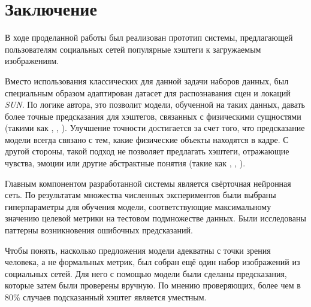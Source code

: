 \section*{Заключение}


\indent
\indent
\indent
В ходе проделанной работы был реализован прототип системы,
предлагающей пользователям социальных сетей популярные 
хэштеги к загружаемым изображениям.


\bigskip
\indent
\indent
Вместо использования классических для данной задачи наборов данных,
был специальным образом адаптирован 
датасет для распознавания сцен и локаций \textit{SUN}.
По логике автора, это позволит модели, обученной на таких данных,
давать более точные предсказания для хэштегов, связанных
с  физическими сущностями (такими как , , ).
Улучшение точности достигается за счет того, что предсказание модели всегда связано
с тем, какие физические объекты находятся в кадре. С другой стороны,
такой подход не позволяет предлагать хэштеги, отражающие чувства, эмоции
или другие абстрактные понятия (такие как , , ).


\bigskip
\indent
\indent
Главным компонентом разработанной системы является свёрточная 
нейронная сеть. По результатам множества численных экспериментов
были выбраны гиперпараметры для обучения модели, 
соответствующие максимальному 
значению целевой метрики на тестовом подмножестве данных.
Были исследованы паттерны возникновения ошибочных предсказаний.


\bigskip
\indent
\indent
Чтобы понять, насколько предложения модели адекватны с точки зрения 
человека, а не формальных метрик, был собран ещё один набор изображений
из социальных сетей. Для него с помощью модели были сделаны 
предсказания, которые затем были проверены вручную. 
По мнению проверяющих, более чем в 80\% случаев 
подсказанный хэштег является уместным.

